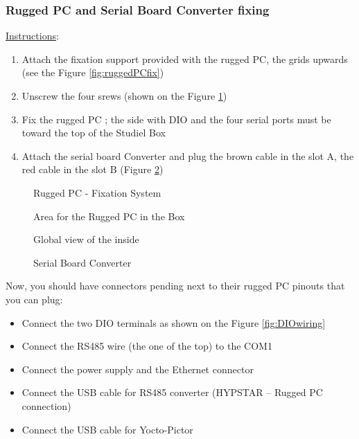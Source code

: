 \clearpage
\subsubsection{Rugged PC and Serial Board Converter fixing}

\underline{Instructions}:
\begin{enumerate}
	\item Attach the fixation support provided with the rugged PC, the grids upwards 
		(see the Figure \ref{fig:ruggedPCfix})
	\item Unscrew the four srews (shown on the Figure
		\ref{fig:StudielBoxRuggedPCemplacement})
	\item Fix the rugged PC ;  the side with DIO and the four serial ports must
		be toward the top of the Studiel Box
	\item Attach the serial board Converter and plug the brown cable in the
		slot A, the red cable in the slot B (Figure \ref{fig:serialBoard})
\end{enumerate}

\begin{figure}[!ht]
  \centering
  \begin{minipage}[b]{0.49\textwidth}
	  \caption{Rugged PC - Fixation System}
	\label{fig:ruggedPCfix}
  \end{minipage}
  \hfill
  \begin{minipage}[b]{0.49\textwidth}
	  \caption{Area for the Rugged PC in the Box}
	\label{fig:StudielBoxRuggedPCemplacement}
  \end{minipage}
\end{figure}


\begin{figure}[!ht]
  \centering
  \begin{minipage}[b]{0.75\textwidth}
	  \vspace{-20pt}
	  \caption{Global view of the inside}
	\label{label}
  \end{minipage}
  \hfill
  \begin{minipage}[b]{0.24\textwidth}
	  \caption{Serial Board Converter}
	\label{fig:serialBoard}
  \end{minipage}
\end{figure}

\noindent Now, you should have connectors pending next to their rugged PC pinouts that 
you can plug:
\begin{itemize}
	\item Connect the two DIO terminals as shown on the Figure
		\ref{fig:DIOwiring}
	\item Connect the RS485 wire (the one of the top) to the COM1
	\item Connect the power supply and the Ethernet connector
	\item Connect the USB cable for RS485 converter (HYPSTAR – Rugged PC connection)
	\item Connect the USB cable for Yocto-Pictor 
\end{itemize}


